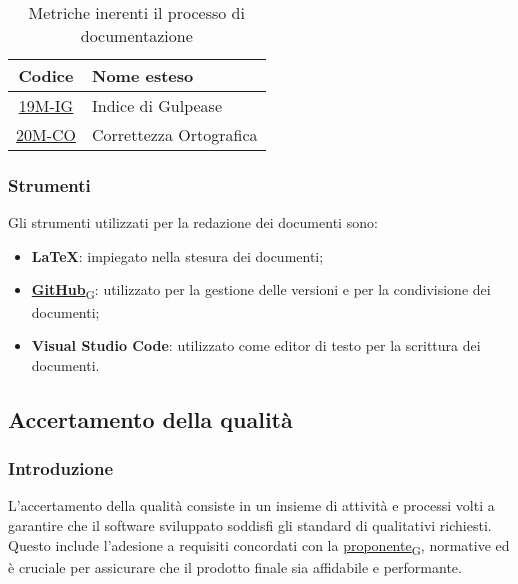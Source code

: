 \begin{table}[!h]
	\centering
	\begin{tabular}{|c|l|}
		\hline
		\textbf{Codice} & \textbf{Nome esteso}               					\\
		\hline
		\underline{\hyperlink{19M}{19M-IG}}     & Indice di Gulpease   			\\
		\underline{\hyperlink{20M}{20M-CO}}     & Correttezza Ortografica  		\\
		\hline
	\end{tabular}
	\caption{Metriche inerenti il processo di documentazione}
\end{table}

\subsubsection{Strumenti}
Gli strumenti utilizzati per la redazione dei documenti sono:
\begin{itemize}
	\item \textbf{LaTeX}: impiegato nella stesura dei documenti;
	\item \href{https://7last.github.io/docs/pb/documentazione-interna/glossario\#github}{\textbf{GitHub}\textsubscript{G}}: utilizzato per la gestione delle versioni e per la condivisione dei documenti;
	\item \textbf{Visual Studio Code}: utilizzato come editor di testo per la scrittura dei documenti.
\end{itemize}



\subsection{Accertamento della qualità}
\subsubsection{Introduzione}
L'accertamento della qualità consiste in un insieme di attività e processi volti a garantire che il software sviluppato soddisfi gli standard di qualitativi richiesti. Questo include l'adesione a requisiti concordati con la \href{https://7last.github.io/docs/pb/documentazione-interna/glossario\#proponente}{proponente\textsubscript{G}}, normative ed è cruciale per assicurare che il prodotto finale sia affidabile e performante.

